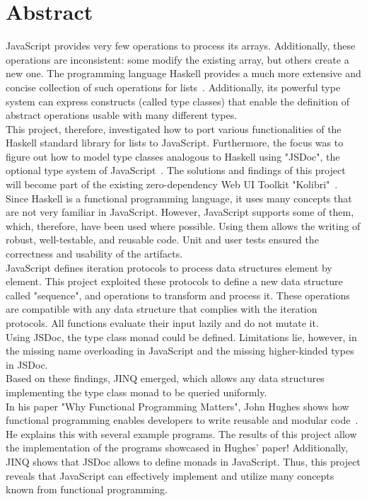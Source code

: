 \chapter*{Abstract}
JavaScript provides very few operations to process its arrays.
Additionally, these operations are inconsistent: some modify the existing
array, but others create a new one. The programming language Haskell provides a
much more extensive and concise collection of such operations for
lists~\cite{haskell_list}. Additionally, its powerful type system can express
constructs (called type classes) that enable the definition of abstract
operations usable with many different types.\\ 
This project, therefore, investigated how to port various functionalities of
the Haskell standard library for lists to JavaScript. Furthermore, the focus
was to figure out how to model type classes analogous to Haskell using "JSDoc",
the optional type system of JavaScript~\cite{jsdoc_use_2023}. The solutions and
findings of this project will become part of the existing zero-dependency Web
UI Toolkit "Kolibri"~\cite{kolibri}. \\
Since Haskell is a functional programming language, it uses many concepts that
are not very familiar in JavaScript. However, JavaScript supports some of them,
which, therefore, have been used where possible. Using them allows the writing
of robust, well-testable, and reusable code. Unit and user tests ensured the
correctness and usability of the artifacts. \\
JavaScript defines iteration protocols to process data structures element by
element. This project exploited these protocols to define a new data structure
called "sequence", and operations to transform and process it. These operations
are compatible with any data structure that complies with the iteration
protocols. All functions evaluate their input lazily and do not mutate it.\\
Using JSDoc, the type class monad could be defined. Limitations lie, however,
in the missing name overloading in JavaScript and the missing higher-kinded
types in JSDoc.\\
Based on these findings, JINQ emerged, which allows any data structures
implementing the type class monad to be queried uniformly.\\
In his paper "Why Functional Programming Matters", John Hughes shows how
functional programming enables developers to write reusable and modular
code~\cite{hughes_why_1989}. He explains this with several example programs.
The results of this project allow the implementation of the programs showcased
in Hughes' paper! Additionally, JINQ shows that JSDoc allows to define
monads in JavaScript. Thus, this project reveals that JavaScript can
effectively implement and utilize many concepts known from functional
programming.
